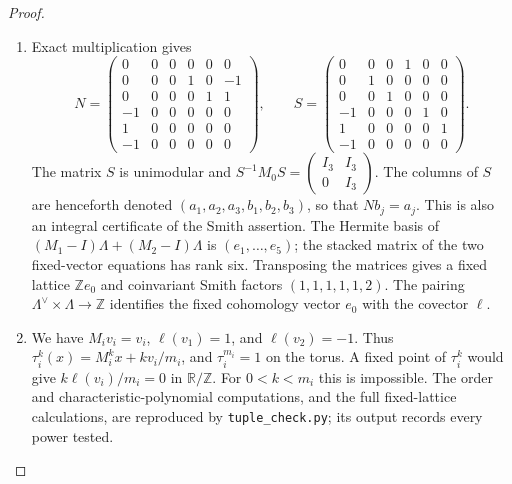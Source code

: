 \begin{proof}
\begin{enumerate}[label=\arabic*.]
\item Exact multiplication gives
\[
N=\begin{pmatrix}
0&0&0&0&0&0\\0&0&0&1&0&-1\\0&0&0&0&1&1\\
-1&0&0&0&0&0\\1&0&0&0&0&0\\-1&0&0&0&0&0
\end{pmatrix},\qquad
S=\begin{pmatrix}
0&0&0&1&0&0\\0&1&0&0&0&0\\0&0&1&0&0&0\\
-1&0&0&0&1&0\\1&0&0&0&0&1\\-1&0&0&0&0&0
\end{pmatrix}.
\]
The matrix $S$ is unimodular and
$S^{-1}M_0S=\left(\begin{smallmatrix}I_3&I_3\\0&I_3\end{smallmatrix}\right)$.
The columns of $S$ are henceforth denoted
$(a_1,a_2,a_3,b_1,b_2,b_3)$, so that $Nb_j=a_j$.
This is also an integral certificate of the Smith assertion.
The Hermite basis of
$(M_1-I)\Lambda+(M_2-I)\Lambda$ is $(e_1,\ldots,e_5)$;
the stacked matrix of the two fixed-vector equations has rank six.
Transposing the matrices gives a fixed lattice $\mathbb Ze_0$ and
coinvariant Smith factors $(1,1,1,1,1,2)$.  The pairing
$\Lambda^\vee\times\Lambda\longrightarrow\mathbb Z$ identifies the
fixed cohomology vector $e_0$ with the covector $\ell$.

\item We have $M_iv_i=v_i$, $\ell(v_1)=1$, and $\ell(v_2)=-1$.
Thus $\tau_i^k(x)=M_i^kx+kv_i/m_i$, and $\tau_i^{m_i}=1$ on the
torus.  A fixed point of $\tau_i^k$ would give
$k\ell(v_i)/m_i=0$ in $\mathbb R/\mathbb Z$.  For
$0<k<m_i$ this is impossible.  The order and characteristic-polynomial
computations, and the full fixed-lattice calculations, are reproduced by
\texttt{tuple\_check.py}; its output records every power tested.

\end{enumerate}
\end{proof}




